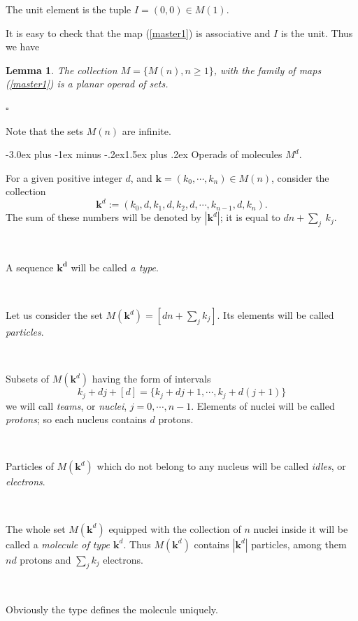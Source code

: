 \documentclass[12pt,a4paper]{article}
\makeatletter
\newtheorem{lemma}[theorem]{Lemma}
\renewcommand{\subsection}{\@startsection{subsection}{2}{0pt}%
{-3.0ex plus -1ex minus -.2ex}{-1.5ex plus .2ex}%
{\normalfont\large\bf}}
\renewcommand{\subsection}{\@startsection{subsection}{2}{0pt}%
{-3.0ex plus -1ex minus -.2ex}{1.5ex plus .2ex}%
{\normalfont\large\bf}}
\renewcommand{\subsection}{\@startsection{subsection}{2}{0pt}%
{-3.0ex plus -1ex minus -.2ex}{-1.5ex plus .2ex}%
{\normalfont\normalsize\bf}}
\renewcommand{\subsection}{\@startsection{subsection}{2}{0pt}%
{-3.0ex plus -1ex minus -.2ex}{1.5ex plus .2ex}%
{\normalfont\normalsize\bf}}
\makeatother
\begin{document}
 The unit element is the tuple $I=(0,0)\in M(1)$.
 
 It is easy to check that the map (\ref{master1}) is associative and $I$ is the unit. 
 Thus  we have
 
 
 \begin{lemma}\label{master0}
 The collection  $M = \{M(n), n\ge 1\}$, with the  family of maps (\ref{master1}) is a planar operad of sets.
 \end{lemma}
 $\square$

Note that the sets $M(n)$ are infinite.
 
  \subsection{Operads of molecules $M^d$.}\label{operad-molecules}

For a given positive integer $d$,  and  
  $\mathbf k=(k_0, \cdots, k_n)\in M(n)$, consider the  collection
  \[
  \mathbf k^d := (k_0, d, k_1, d, k_2, d, \cdots , k_{n-1}, d, k_n).
  \]
  The sum of these numbers will be denoted by $|\mathbf{k}^d|$; it is equal to $dn+\sum_j\ k_j$. 
  
  \
  
  A sequence $\mathbf{k^d}$ will be called {\em a type}.
  
  
  \
  
  Let us consider  the   set $M(\mathbf{k}^d) = [dn +\sum_j k_j]$. Its elements will be called {\em particles}.   
  
  \ 
  
  Subsets of $M(\mathbf{k}^d)$ having the form  of intervals 
  $$
  k_j + dj + [d] = \{k_j+dj+1, \cdots, k_j+d(j+1)\}
  $$  
  we will call {\em teams}, or {\em nuclei}, $j=0, \cdots, n-1$. Elements of nuclei will be called 
  {\em protons}; so each nucleus contains $d$ protons. 
  
  \ 
  
  Particles of $M(\mathbf{k}^d)$ which do  not belong to any nucleus will be called {\em idles}, or {\em electrons}. 
  
  \
   
  The whole set $M(\mathbf{k}^d)$ equipped with the collection of 
  $n$ nuclei inside it will be called a {\em molecule of type $\mathbf{k}^d$}. Thus $M(\mathbf{k}^d)$ contains $|\mathbf{k}^d|$ particles, among them $nd$ protons and 
  $\sum_j k_j$ electrons.
  
  \ 
  
  Obviously the type defines the molecule uniquely.  
  
\end{document}
